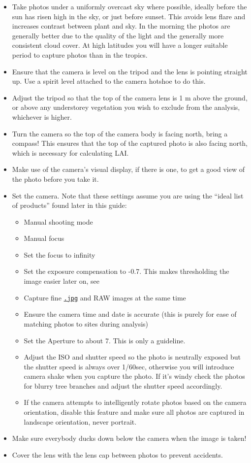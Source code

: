 \documentclass{article}
\newcommand\file[1]{\texttt{\underline{#1}}}
\begin{document}
\begin{itemize}
	\item{Take photos under a uniformly overcast sky where possible, ideally before the sun has risen high in the sky, or just before sunset. This avoids lens flare and increases contrast between plant and sky. In the morning the photos are generally better due to the quality of the light and the generally more consistent cloud cover. At high latitudes you will have a longer suitable period to capture photos than in the tropics.}
	\item{Ensure that the camera is level on the tripod and the lens is pointing straight up. Use a spirit level attached to the camera hotshoe to do this.}
	\item{Adjust the tripod so that the top of the camera lens is 1 m above the ground, or above any understorey vegetation you wish to exclude from the analysis, whichever is higher.} 
	\item{Turn the camera so the top of the camera body is facing north, bring a compass! This ensures that the top of the captured photo is also facing north, which is necessary for calculating LAI.}
	\item{Make use of the camera's visual display, if there is one, to get a good view of the photo before you take it.}
	\item{Set the camera. Note that these settings assume you are using the
		``ideal list of products'' found later in this guide:}
		\begin{itemize}
			\item{Manual shooting mode}
			\item{Manual focus}
			\item{Set the focus to infinity}
			\item{Set the exposure compensation to -0.7. This makes thresholding the image easier later on, see \citet{Zhang2005}}
			\item{Capture fine \file{.jpg} and RAW images at the same time}
			\item{Ensure the camera time and date is accurate (this is purely for ease of matching photos to sites during analysis)}
			\item{Set the Aperture to about 7. This is only a guideline.}
			\item{Adjust the ISO and shutter speed so the photo is neutrally exposed but the shutter speed is always over 1/60sec, otherwise you will introduce camera shake when you capture the photo. If it's windy check the photos for blurry tree branches and adjust the shutter speed accordingly.}
			\item{If the camera attempts to intelligently rotate photos based on the camera orientation, disable this feature and make sure all photos are captured in landscape orientation, never portrait.}
		\end{itemize}
	\item{Make sure everybody ducks down below the camera when the image is taken!}
	\item{Cover the lens with the lens cap between photos to prevent accidents.}
\end{itemize}
\end{document}
